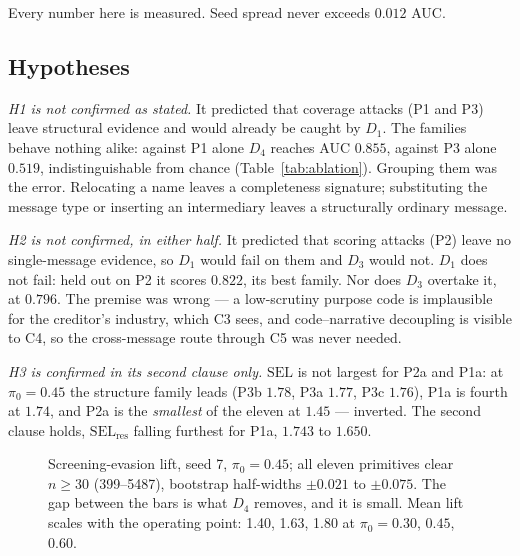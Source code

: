 \documentclass[conference]{IEEEtran}
\begin{document}
Every number here is measured. Seed spread never exceeds $0.012$ AUC.

\subsection{Hypotheses}
\emph{H1 is not confirmed as stated.} It predicted that coverage attacks
(P1 and P3) leave structural evidence and would already be caught by $D_1$.
The families behave nothing alike: against P1 alone $D_4$ reaches AUC
$0.855$, against P3 alone $0.519$, indistinguishable from chance
(Table~\ref{tab:ablation}). Grouping them was the error. Relocating a name
leaves a completeness signature; substituting the message type or inserting
an intermediary leaves a structurally ordinary message.

\emph{H2 is not confirmed, in either half.} It predicted that scoring attacks
(P2) leave no single-message evidence, so $D_1$ would fail on them and $D_3$
would not. $D_1$ does not fail: held out on P2 it scores $0.822$, its best family. Nor
does $D_3$ overtake it, at $0.796$. The premise was wrong --- a low-scrutiny
purpose code is implausible for the creditor's industry, which C3 sees, and
code--narrative decoupling is visible to C4, so the cross-message route
through C5 was never needed.

\emph{H3 is confirmed in its second clause only.} $\mathrm{SEL}$ is not
largest for P2a and P1a: at $\pi_0=0.45$ the structure family leads (P3b
$1.78$, P3a $1.77$, P3c $1.76$), P1a is fourth at $1.74$, and P2a is the
\emph{smallest} of the eleven at $1.45$ --- inverted. The second clause
holds, $\mathrm{SEL_{res}}$ falling furthest for P1a, $1.743$ to $1.650$.

\begin{figure}[!tbp]
\centering
{}
\caption{Screening-evasion lift, seed 7, $\pi_0=0.45$; all eleven primitives clear
$n\!\ge\!30$ (399--5487), bootstrap half-widths $\pm0.021$ to $\pm0.075$.
The gap between the bars is what $D_4$ removes, and it is small. Mean lift
scales with the operating point: 1.40, 1.63, 1.80 at $\pi_0=0.30$, $0.45$,
$0.60$.}
\label{fig:sel}
\end{figure}
\end{document}

